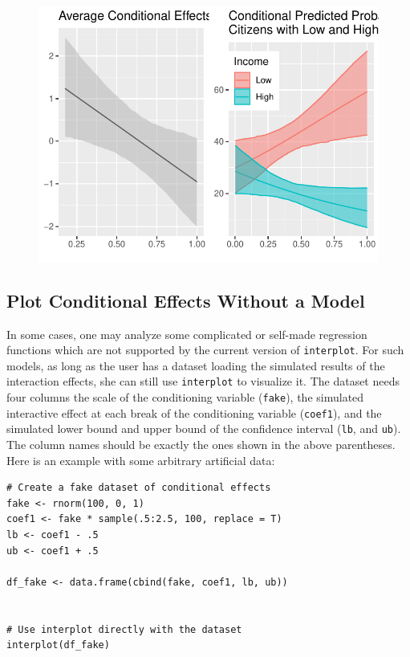 \documentclass[
  article]{jss}
\begin{document}
\begin{figure}[H]

{\centering \includegraphics{jss_manuscript_files/figure-pdf/unnamed-chunk-18-1.pdf}

}

\end{figure}

\hypertarget{sec-plot-conditional-effects-without-a-model}{%
\subsection{Plot Conditional Effects Without a
Model}\label{sec-plot-conditional-effects-without-a-model}}

In some cases, one may analyze some complicated or self-made regression
functions which are not supported by the current version of
\texttt{interplot}. For such models, as long as the user has a dataset
loading the simulated results of the interaction effects, she can still
use \texttt{interplot} to visualize it. The dataset needs four columns
the scale of the conditioning variable (\texttt{fake}), the simulated
interactive effect at each break of the conditioning variable
(\texttt{coef1}), and the simulated lower bound and upper bound of the
confidence interval (\texttt{lb}, and \texttt{ub}). The column names
should be exactly the ones shown in the above parentheses. Here is an
example with some arbitrary artificial data:

\begin{verbatim}
# Create a fake dataset of conditional effects
fake <- rnorm(100, 0, 1)
coef1 <- fake * sample(.5:2.5, 100, replace = T)
lb <- coef1 - .5
ub <- coef1 + .5

df_fake <- data.frame(cbind(fake, coef1, lb, ub))


# Use interplot directly with the dataset
interplot(df_fake)
\end{verbatim}
\end{document}
